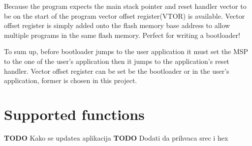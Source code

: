 Because the program expects the main stack pointer and reset handler vector to be on the start of the program vector offset register(VTOR) is available. Vector offset register is simply added onto the flash memory base address to allow multiple programs in the same flash memory. Perfect for writing a bootloader!

To sum up, before bootloader jumps to the user application it must set the MSP to the one of the user's application then it jumps to the application's reset handler. Vector offset register can be set be the bootloader or in the user's application, former is chosen in this project.


\section{Supported functions}


\textbf{TODO} Kako se updatea aplikacija
\textbf{TODO} Dodati da prihvaca srec i hex